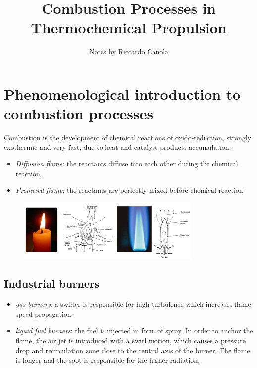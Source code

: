 \documentclass[12pt]{article}
\title{Combustion Processes in Thermochemical Propulsion}
\date{}
\author{Notes by Riccardo Canola}
\begin{document}
\maketitle

\newpage

\tableofcontents

\newpage

\section{Phenomenological introduction to combustion processes}

Combustion is the development of chemical reactions of oxido-reduction, strongly exothermic and very fast, due to heat and catalyst products accumulation.
\begin{itemize}
    \item \textit{Diffusion flame}: the reactants diffuse into each other during the chemical reaction.
    \item \textit{Premixed flame}: the reactants are perfectly mixed before chemical reaction.
\end{itemize}

\begin{figure}[!ht]
\centering
\includegraphics[width=0.8\textwidth]{figures/diffusion_premixed.png}
\end{figure}

\subsection{Industrial burners}

\begin{itemize}
    \item \textit{gas burners}: a swirler is responsible for high turbulence which increases flame speed propagation.
    \item \textit{liquid fuel burners}: the fuel is injected in form of spray. In order to anchor the flame, the air jet is introduced with a swirl motion, which causes a pressure drop and recirculation zone close to the central axis of the burner. The flame is longer and the soot is responsible for the higher radiation.
\end{itemize}
\end{document}
